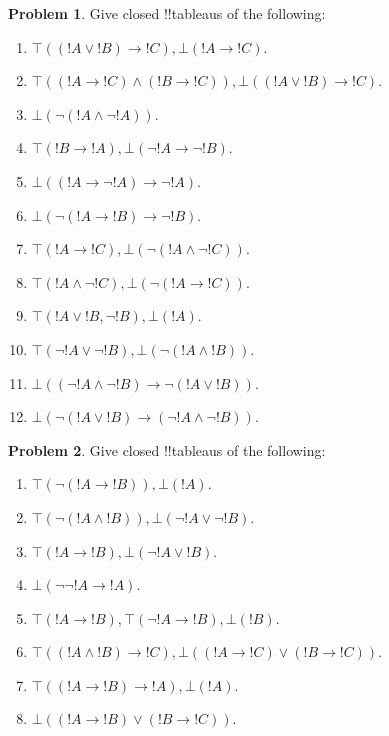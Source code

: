 \documentclass[10pt,a4paper]{article}
\theoremstyle{plain}
\theoremstyle{definition}
\newtheorem{prob}{Problem}[section]
\theoremstyle{remark}
\providecommand{\lif}{\mathbin{\rightarrow}}
\providecommand{\sFmla}[2]{#1(#2)}
\providecommand{\True}{\top}
\providecommand{\False}{\bot}
\begin{document}
\begin{prob}
Give closed !!{tableau}s of the following:
\begin{enumerate}
\item $\sFmla{\True}{(!A \lor !B) \lif !C}, \sFmla{\False}{!A \lif !C}$.
\item $\sFmla{\True}{(!A \lif !C) \land (!B \lif !C)}, \sFmla{\False}{(!A \lor !B) \lif !C}$.
\item $\sFmla{\False}{\lnot(!A \land \lnot !A)}$.
\item $\sFmla{\True}{!B \lif !A}, \sFmla{\False}{\lnot !A \lif \lnot !B}$.
\item $\sFmla{\False}{(!A \lif \lnot !A) \lif \lnot !A}$.
\item $\sFmla{\False}{\lnot(!A \lif !B) \lif \lnot !B}$.
\item $\sFmla{\True}{!A \lif !C}, \sFmla{\False}{\lnot (!A \land \lnot !C)}$.
\item $\sFmla{\True}{!A \land \lnot !C}, \sFmla{\False}{\lnot (!A \lif !C)}$.
\item $\sFmla{\True}{!A \lor !B, \lnot !B}, \sFmla{\False}{!A}$.
\item $\sFmla{\True}{\lnot !A \lor \lnot !B}, \sFmla{\False}{\lnot(!A \land !B)}$.
\item $\sFmla{\False}{(\lnot !A \land \lnot !B) \lif\lnot(!A \lor !B)}$.
\item $\sFmla{\False}{\lnot(!A \lor !B) \lif (\lnot !A \land \lnot !B)}$.
\end{enumerate}
\end{prob}

\begin{prob}
Give closed !!{tableau}s of the following:
\begin{enumerate}
\item $\sFmla{\True}{\lnot(!A \lif !B)}, \sFmla{\False}{!A}$.
\item $\sFmla{\True}{\lnot(!A \land !B)}, \sFmla{\False}{\lnot !A \lor \lnot !B}$.
\item $\sFmla{\True}{!A \lif !B}, \sFmla{\False}{\lnot !A \lor !B}$.
\item $\sFmla{\False}{\lnot \lnot !A \lif !A}$.
\item $\sFmla{\True}{!A \lif !B}, \sFmla{\True}{\lnot !A \lif !B}, \sFmla{\False}{!B}$.
\item $\sFmla{\True}{(!A \land !B) \lif !C}, \sFmla{\False}{(!A \lif !C) \lor (!B \lif !C)}$.
\item $\sFmla{\True}{(!A \lif !B) \lif !A}, \sFmla{\False}{!A}$.
\item $\sFmla{\False}{(!A \lif !B) \lor (!B \lif !C)}$.
\end{enumerate}
\end{prob}
\end{document}
